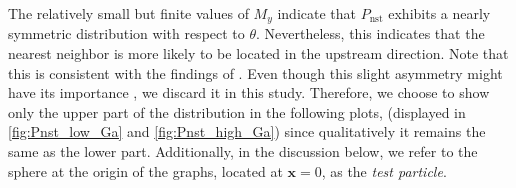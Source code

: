 The relatively small but finite values of $M_y$ indicate that $P_\text{nst}$ exhibits a nearly symmetric distribution with respect to $\theta$.
Nevertheless, this indicates that the nearest neighbor is more likely to be located in the upstream direction. 
Note that this is consistent with the findings of \citet{zhang2023evolution}.
Even though this slight asymmetry might have its importance \cite{zhang2023evolution}, we discard it in this study. 
Therefore, we choose to show only the upper part of the distribution in the following plots, (displayed in \ref{fig:Pnst_low_Ga} and \ref{fig:Pnst_high_Ga}) since qualitatively it remains the same as the lower part.  
Additionally, in the discussion below, we refer to the sphere at the origin of the graphs, located at $\textbf{x}=0$, as the \textit{test particle}.%

